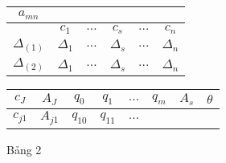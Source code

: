 \documentclass{article}
\begin{document}
\begin{enumerate}
\begin{figure}[H]
\begin{center}
\begin{tabular}{|c|c|c|c|c|c|}
                                        \cellcolor[rgb]{1, .753, .0}$a_{mn}$ \\
                                        \hline
                                        & 
                                        \cellcolor[rgb]{0, .69, .941}$c_1$ & 
                                        \cellcolor[rgb]{0, .69, .941}$\ldots$ & 
                                        \cellcolor[rgb]{0, .69, .941}$c_s$ & 
                                        \cellcolor[rgb]{0, .69, .941}$\ldots$ & 
                                        \cellcolor[rgb]{0, .69, .941}$c_n$ \\
                                        \hline
                                        $\Delta_{(1)}$ & $\Delta_1$ & $\ldots$ & $\Delta_s$ & $\ldots$ & $\Delta_n$ \\
                                        \hline
                                        $\Delta_{(2)}$ & $\Delta_1$ & $\ldots$ & $\Delta_s$ & $\ldots$ & $\Delta_n$ \\
                                        \hline    
                                    \end{tabular}
                                \end{center}  
                            \end{figure} 
                            \begin{figure}[H]
                            \caption*{Bảng 2}
                                \begin{center}
                                    \begin{tabular}{|c|c|c|c|c|c|c|c|}
                                            \hline
                                            $c_J$ & 
                                            $A_J$ & 
                                            $q_0$ & 
                                            $q_1$ & 
                                            $\ldots$ & 
                                            $q_m$ &
                                            $A_s$ & 
                                            $\theta$ \\
                                            \hline
                                            $c_{j1}$ & 
                                            $A_{j1}$ & 
                                            \cellcolor[rgb]{0, .69, .941}$q_{10}$ & 
                                            \cellcolor[rgb]{1, .753, .0}$q_{11}$ & 
                                            \cellcolor[rgb]{1, .753, .0}$\ldots$ & 

\end{tabular}
\end{center}
\end{figure}
\end{enumerate}
\end{document}
